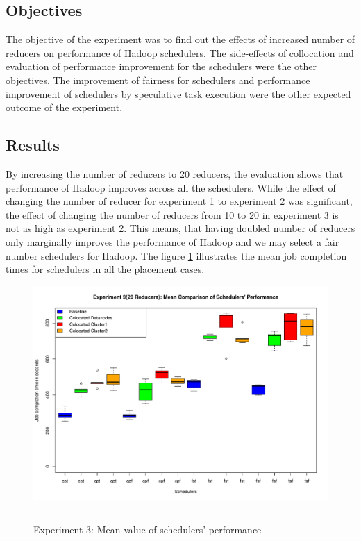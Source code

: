 \subsection{Objectives}
The objective of the experiment was to find out the effects of increased number of reducers on performance of Hadoop schedulers. The side-effects of collocation and evaluation of performance improvement for the schedulers were the other objectives. The improvement of fairness for schedulers and  performance improvement of schedulers by speculative task execution were the other expected outcome of the experiment. 

\subsection{Results }
By increasing the number of reducers to 20 reducers, the evaluation shows that performance of Hadoop improves across all the schedulers. While the effect of changing the number of reducer for experiment 1 to experiment 2 was significant, the effect of changing the number of reducers from 10 to 20 in experiment 3 is not as high as experiment 2. This means, that having doubled number of reducers only marginally improves the performance of Hadoop and we may select a fair number schedulers for Hadoop. The figure \ref{fig:exp_3_mean} illustrates the mean job completion times for schedulers in all the placement cases.  


\begin{figure}[htbp]
  \centering
    \includegraphics[width=\textwidth,height=\textheight,keepaspectratio]{./Figures/exp_3_mean.pdf}
    \rule{35em}{0.5pt}
  \caption{Experiment 3: Mean value of schedulers' performance}
  \label{fig:exp_3_mean}
\end{figure}


